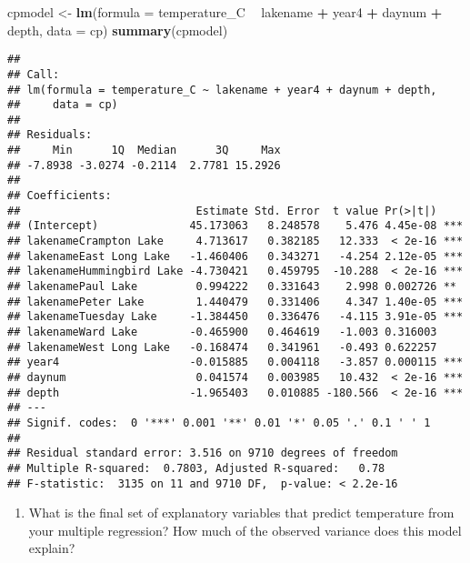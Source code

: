 \documentclass[
]{article}
\newenvironment{Shaded}{\begin{snugshade}}{\end{snugshade}}
\newcommand{\DataTypeTok}[1]{\textcolor[rgb]{0.13,0.29,0.53}{#1}}
\newcommand{\KeywordTok}[1]{\textcolor[rgb]{0.13,0.29,0.53}{\textbf{#1}}}
\newcommand{\NormalTok}[1]{#1}
\newcommand{\OperatorTok}[1]{\textcolor[rgb]{0.81,0.36,0.00}{\textbf{#1}}}
\newcommand{\StringTok}[1]{\textcolor[rgb]{0.31,0.60,0.02}{#1}}
\providecommand{\tightlist}{%
  \setlength{\itemsep}{0pt}\setlength{\parskip}{0pt}}
\begin{document}
\begin{Shaded}
\begin{Highlighting}[]
\NormalTok{cpmodel <-}\StringTok{ }\KeywordTok{lm}\NormalTok{(}\DataTypeTok{formula =}\NormalTok{ temperature_C }\OperatorTok{~}\StringTok{ }\NormalTok{lakename }\OperatorTok{+}\StringTok{ }\NormalTok{year4 }\OperatorTok{+}\StringTok{ }\NormalTok{daynum }\OperatorTok{+}\StringTok{ }\NormalTok{depth, }
    \DataTypeTok{data =}\NormalTok{ cp)}
\KeywordTok{summary}\NormalTok{(cpmodel)}
\end{Highlighting}
\end{Shaded}

\begin{verbatim}
## 
## Call:
## lm(formula = temperature_C ~ lakename + year4 + daynum + depth, 
##     data = cp)
## 
## Residuals:
##     Min      1Q  Median      3Q     Max 
## -7.8938 -3.0274 -0.2114  2.7781 15.2926 
## 
## Coefficients:
##                           Estimate Std. Error  t value Pr(>|t|)    
## (Intercept)              45.173063   8.248578    5.476 4.45e-08 ***
## lakenameCrampton Lake     4.713617   0.382185   12.333  < 2e-16 ***
## lakenameEast Long Lake   -1.460406   0.343271   -4.254 2.12e-05 ***
## lakenameHummingbird Lake -4.730421   0.459795  -10.288  < 2e-16 ***
## lakenamePaul Lake         0.994222   0.331643    2.998 0.002726 ** 
## lakenamePeter Lake        1.440479   0.331406    4.347 1.40e-05 ***
## lakenameTuesday Lake     -1.384450   0.336476   -4.115 3.91e-05 ***
## lakenameWard Lake        -0.465900   0.464619   -1.003 0.316003    
## lakenameWest Long Lake   -0.168474   0.341961   -0.493 0.622257    
## year4                    -0.015885   0.004118   -3.857 0.000115 ***
## daynum                    0.041574   0.003985   10.432  < 2e-16 ***
## depth                    -1.965403   0.010885 -180.566  < 2e-16 ***
## ---
## Signif. codes:  0 '***' 0.001 '**' 0.01 '*' 0.05 '.' 0.1 ' ' 1
## 
## Residual standard error: 3.516 on 9710 degrees of freedom
## Multiple R-squared:  0.7803, Adjusted R-squared:   0.78 
## F-statistic:  3135 on 11 and 9710 DF,  p-value: < 2.2e-16
\end{verbatim}

\begin{enumerate}
\def\labelenumi{\arabic{enumi}.}
\setcounter{enumi}{4}
\tightlist
\item
  What is the final set of explanatory variables that predict
  temperature from your multiple regression? How much of the observed
  variance does this model explain?
\end{enumerate}
\end{document}
